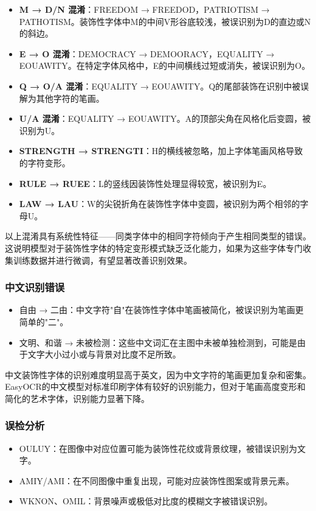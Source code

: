 \documentclass[12pt,hyperref,a4paper,UTF8]{ctexart}
\begin{document}
\begin{itemize}
    \item \textbf{M → D/N 混淆}：FREEDOM → FREEDOD，PATRIOTISM → PATHOTISM。装饰性字体中M的中间V形谷底较浅，被误识别为D的直边或N的斜边。
    \item \textbf{E → O 混淆}：DEMOCRACY → DEMOORACY，EQUALITY → EOUAWITY。在特定字体风格中，E的中间横线过短或消失，被误识别为O。
    \item \textbf{Q → O/A 混淆}：EQUALITY → EOUAWITY。Q的尾部装饰在识别中被误解为其他字符的笔画。
    \item \textbf{U/A 混淆}：EQUALITY → EOUAWITY。A的顶部尖角在风格化后变圆，被识别为U。
    \item \textbf{STRENGTH → STRENGTI}：H的横线被忽略，加上字体笔画风格导致的字符变形。
    \item \textbf{RULE → RUEE}：L的竖线因装饰性处理显得较宽，被识别为E。
    \item \textbf{LAW → LAU}：W的尖锐折角在装饰性字体中变圆，被识别为两个相邻的字母U。
\end{itemize}

以上混淆具有系统性特征——同类字体中的相同字符倾向于产生相同类型的错误。这说明模型对于装饰性字体的特定变形模式缺乏泛化能力，如果为这些字体专门收集训练数据并进行微调，有望显著改善识别效果。

\subsubsection{中文识别错误}

\begin{itemize}
    \item 自由 → 二由：中文字符"自"在装饰性字体中笔画被简化，被误识别为笔画更简单的"二"。
    \item 文明、和谐 → 未被检测：这些中文词汇在主图中未被单独检测到，可能是由于文字大小过小或与背景对比度不足所致。
\end{itemize}

中文装饰性字体的识别难度明显高于英文，因为中文字符的笔画更加复杂和密集。EasyOCR的中文模型对标准印刷字体有较好的识别能力，但对于笔画高度变形和简化的艺术字体，识别能力显著下降。

\subsubsection{误检分析}

\begin{itemize}
    \item OULUY：在图像中对应位置可能为装饰性花纹或背景纹理，被错误识别为文字。
    \item AMIY/AMI：在不同图像中重复出现，可能对应装饰性图案或背景元素。
    \item WKNON、OMIL：背景噪声或极低对比度的模糊文字被错误识别。
\end{itemize}
\end{document}
